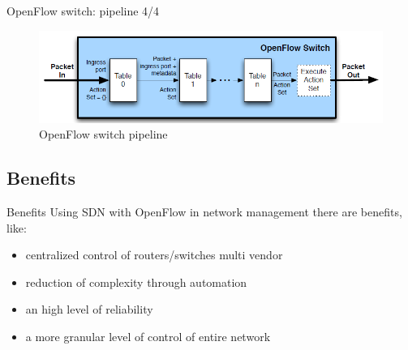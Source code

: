 \begin{frame}{OpenFlow switch: \small{pipeline 4/4}}
\begin{figure}
\includegraphics[scale=0.45]{Immagini/OpenFlowPipeline.png}
\caption{OpenFlow switch pipeline}
\label{fig:OpenFlowSwitchPipeline}
\end{figure}
\end{frame}

\subsection*{Benefits}
\begin{frame}{Benefits}
Using SDN with OpenFlow in network management there are benefits, like:
\begin{itemize}
\item<2-> centralized control of routers/switches multi vendor
\item<3-> reduction of complexity through automation
\item<4-> an high level of reliability
\item<5-> a more granular level of control of entire network
\end{itemize}
\end{frame}